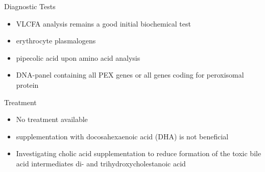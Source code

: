 \documentclass[presentation, smaller]{beamer}
\begin{document}
\begin{frame}[label={sec:orga6bbcd5}]{Diagnostic Tests}
\begin{itemize}
\item VLCFA analysis remains a good initial biochemical test
\item erythrocyte plasmalogens
\item pipecolic acid upon amino acid analysis
\item DNA-panel containing all PEX genes or all genes coding for
peroxisomal protein
\end{itemize}
\end{frame}

\begin{frame}[label={sec:org29512b7}]{Treatment}
\begin{itemize}
\item No treatment available
\item supplementation with docosahexaenoic acid (DHA) is not beneficial
\item Investigating cholic acid supplementation to reduce formation of the
toxic bile acid intermediates di- and trihydroxycholestanoic acid
\end{itemize}
\end{frame}
\end{document}
